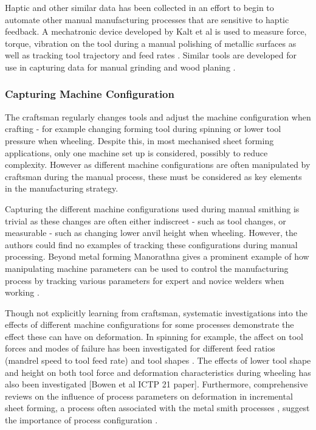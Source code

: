 Haptic and other similar data has been collected in an effort to begin to automate other manual manufacturing processes that are sensitive to haptic feedback. A mechatronic device developed by Kalt et al is used to measure force, torque, vibration on the tool during a manual polishing of metallic surfaces as well as tracking tool trajectory and feed rates \citep{Kalt2016TowardsOperation}. Similar tools are developed for use in capturing data for manual grinding \citep{Phan2018InstrumentationWorkpiece} and wood planing \citep{Montebelli2015OnTasks}.


\subsubsection{Capturing Machine Configuration}
The craftsman regularly changes tools and adjust the machine configuration when crafting - for example changing forming tool during spinning or lower tool pressure when wheeling. Despite this, in most mechanised sheet forming applications, only one machine set up is considered, possibly to reduce complexity. However as different machine configurations are often manipulated by craftsman during the manual process, these must be considered as key elements in the manufacturing strategy.

Capturing the different machine configurations used during  manual smithing is trivial as these changes are often either indiscreet - such as tool changes, or measurable - such as changing lower anvil height when wheeling. However, the authors could find no examples of tracking these configurations during manual processing. Beyond metal forming Manorathna gives a prominent example of how manipulating machine parameters can be used to control the manufacturing process by tracking various parameters for expert and novice welders when working \citep{Manorathna2017HumanAutomation}. 

Though not explicitly learning from craftsman, systematic investigations into the effects of different machine configurations for some processes demonstrate the effect these can have on deformation. In spinning for example, the affect on tool forces and modes of failure has been investigated for different feed ratios (mandrel speed to tool feed rate) \citep{Sugar2016AnalysisSteels,Essa2010OptimizationAnalysis} and tool shapes \citep{El-Khabeery1991OnCups,Essa2010OptimizationAnalysis}. The effects of lower tool shape and height on both tool force and deformation characteristics during wheeling has also been investigated [Bowen et al ICTP 21 paper]. Furthermore, comprehensive reviews on the influence of process parameters on deformation in incremental sheet forming, a process often associated with the metal smith processes \citep{Music2012TheTools}, suggest the importance of process configuration \citep{Gatea2016ReviewForming,Gohil2021ReviewProcess}.

